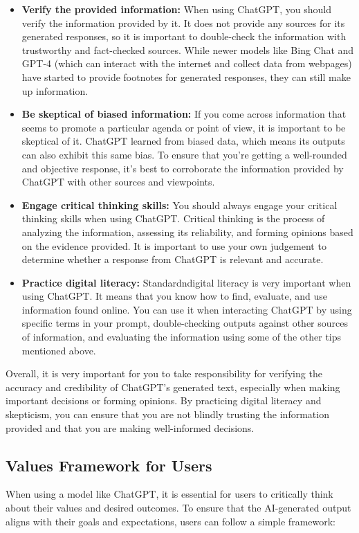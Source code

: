 \documentclass[12pt]{article}
\begin{document}
\begin{itemize}
    \item \textbf{Verify the provided information:} When using ChatGPT, you should verify the information provided by it. It does not provide any sources for its generated responses, so it is important to double-check the information with trustworthy and fact-checked sources. While newer models like Bing Chat and GPT-4 (which can interact with the internet and collect data from webpages) have started to provide footnotes for generated responses, they can still make up information.

    \item \textbf{Be skeptical of biased information:} If you come across information that seems to promote a particular agenda or point of view, it is important to be skeptical of it. ChatGPT learned from biased data, which means its outputs can also exhibit this same bias. To ensure that you're getting a well-rounded and objective response, it's best to corroborate the information provided by ChatGPT with other sources and viewpoints.

    \item \textbf{Engage critical thinking skills:} You should always engage your critical thinking skills when using ChatGPT. Critical thinking is the process of analyzing the information, assessing its reliability, and forming opinions based on the evidence provided. It is important to use your own judgement to determine whether a response from ChatGPT is relevant and accurate. 

    \item \textbf{Practice digital literacy:} Standardndigital literacy is very important when using ChatGPT. It means that you know how to find, evaluate, and use information found online. You can use it when interacting ChatGPT by using specific terms in your prompt, double-checking outputs against other sources of information, and evaluating the information using some of the other tips mentioned above. 
\end{itemize}

Overall, it is very important for you to take responsibility for verifying the accuracy and credibility of ChatGPT's generated text, especially when making important decisions or forming opinions. By practicing digital literacy and skepticism, you can ensure that you are not blindly trusting the information provided and that you are making well-informed decisions.

\subsection{Values Framework for Users}\label{sec:values}
When using a model like ChatGPT, it is essential for users to critically think about their values and desired outcomes. To ensure that the AI-generated output aligns with their goals and expectations, users can follow a simple framework:
\end{document}
